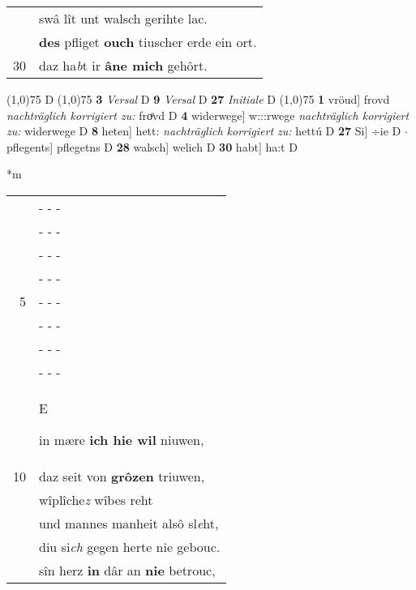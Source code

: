 \documentclass[8pt,a4paper,notitlepage]{article}
\begin{document}
\begin{table}[ht]
\begin{minipage}[t]{0.5\linewidth}
\begin{tabular}{rl}
 & swâ lît unt walsch gerihte lac.\\ 
 & \textbf{des} pfliget \textbf{ouch} tiuscher erde ein ort.\\ 
30 & daz ha\textit{b}t ir \textbf{âne mich} gehôrt.\\ 
\end{tabular}
\scriptsize
\line(1,0){75} \newline
D \newline
\line(1,0){75} \newline
\textbf{3} \textit{Versal} D  \textbf{9} \textit{Versal} D  \textbf{27} \textit{Initiale} D  \newline
\line(1,0){75} \newline
\textbf{1} vröud] frovd \textit{nachträglich korrigiert zu:} froͤvd D \textbf{4} widerwege] w:::rwege \textit{nachträglich korrigiert zu:} widerwege D \textbf{8} heten] hett: \textit{nachträglich korrigiert zu:} hettú D \textbf{27} Si] ÷ie D  $\cdot$ pflegents] pflegetns D \textbf{28} walsch] welich D \textbf{30} habt] ha:t D \newline
\end{minipage}
\hspace{0.5cm}
\begin{minipage}[t]{0.5\linewidth}
\small
\begin{center}*m
\end{center}
\begin{tabular}{rl}
 & \multicolumn{1}{l}{ - - - }\\ 
 & \multicolumn{1}{l}{ - - - }\\ 
 & \multicolumn{1}{l}{ - - - }\\ 
 & \multicolumn{1}{l}{ - - - }\\ 
5 & \multicolumn{1}{l}{ - - - }\\ 
 & \multicolumn{1}{l}{ - - - }\\ 
 & \multicolumn{1}{l}{ - - - }\\ 
 & \multicolumn{1}{l}{ - - - }\\ 
 & \begin{large}E\end{large}in mære \textbf{ich hie wil} niuwen,\\ 
10 & daz seit von \textbf{grôzen} triuwen,\\ 
 & wîplîche\textit{z} wîbes reht\\ 
 & und mannes manheit alsô sl\textit{e}ht,\\ 
 & diu si\textit{ch} gegen herte nie gebouc.\\ 
 & sîn herz \textbf{in} dâr an \textbf{nie} betrouc,\\ 

\end{tabular}
\end{minipage}
\end{table}
\end{document}
